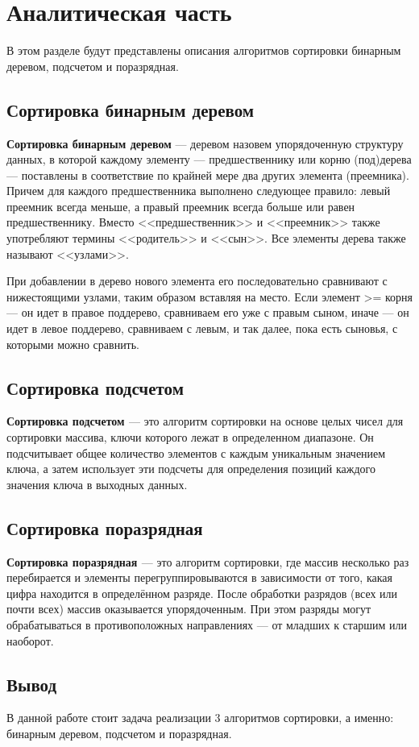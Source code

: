 \chapter{Аналитическая часть}

В этом разделе будут представлены описания алгоритмов сортировки бинарным деревом, подсчетом и поразрядная.


\section{Сортировка бинарным деревом}

\textbf{Сортировка бинарным деревом} \cite{binary} --- деревом назовем упорядоченную структуру данных, в которой каждому элементу --- предшественнику или корню (под)дерева --- поставлены в соответствие по крайней мере два других элемента (преемника). 
Причем для каждого предшественника выполнено следующее правило: левый преемник всегда меньше, а правый преемник всегда больше или равен предшественнику.  
Вместо <<предшественник>> и <<преемник>> также употребляют термины <<родитель>> и <<сын>>. Все элементы дерева также называют <<узлами>>.

При добавлении в дерево нового элемента его последовательно сравнивают с нижестоящими узлами, таким образом вставляя на место.
Если элемент >= корня --- он идет в правое поддерево, сравниваем его уже с правым сыном, иначе --- он идет в левое поддерево, сравниваем с левым, и так далее, пока есть сыновья, с которыми можно сравнить.


\section{Сортировка подсчетом}

\textbf{Сортировка подсчетом \cite{counting_sort}} --- это алгоритм сортировки на основе целых чисел для сортировки массива, ключи которого лежат в определенном диапазоне. Он подсчитывает общее количество элементов с каждым уникальным значением ключа, а затем использует эти подсчеты для определения позиций каждого значения ключа в выходных данных.

\section{Сортировка поразрядная}

\textbf{Сортировка поразрядная \cite{radix_sort}} --- это алгоритм сортировки, где массив несколько раз перебирается и элементы перегруппировываются в зависимости от того, какая цифра находится в определённом разряде. После обработки разрядов (всех или почти всех) массив оказывается упорядоченным. При этом разряды могут обрабатываться в противоположных направлениях --- от младших к старшим или наоборот.



\section*{Вывод}

В данной работе стоит задача реализации 3 алгоритмов сортировки, а
именно: бинарным деревом, подсчетом и поразрядная. 
